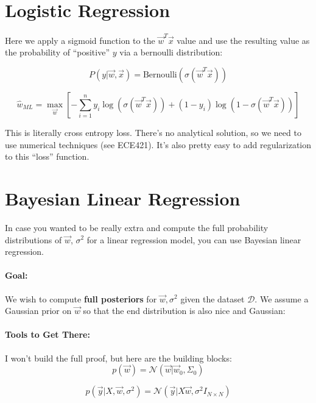 \documentclass[a4paper,12pt]{report}
\begin{document}
\section{Logistic Regression}

Here we apply a sigmoid function to the $\vec w^T \vec x$ value and use the resulting value as the probability of ``positive'' $y$ via a bernoulli distribution:

\begin{equation}
P(y | \vec w, \vec x) = \text{Bernoulli}(\sigma(\vec w^T \vec x))
\end{equation}

\begin{equation}
\hat w_{ML} = \max_{\vec w}[-\sum_{i=1}^{n} y_i\log(\sigma(\vec w^T\vec x)) + (1-y_i) \log(1-\sigma(\vec w^T \vec x))  ]
\end{equation}

This is literally cross entropy loss. There's no analytical solution, so we need to use numerical techniques (see ECE421). It's also pretty easy to add regularization to this ``loss'' function.

\section{Bayesian Linear Regression}

In case you wanted to be really extra and compute the full probability distributions of $\vec w$, $\sigma^2$ for a linear regression model, you can use Bayesian linear regression.

\paragraph{Goal: } We wish to compute \textbf{full posteriors} for $\vec w, \sigma^2$ given the dataset $\mathcal D$. We assume a Gaussian prior on $\vec w$ so that the end distribution is also nice and Gaussian:

\paragraph{Tools to Get There: } I won't build the full proof, but here are the building blocks:
\begin{equation}
p(\vec w) = \mathcal N(\vec w | \vec w_0, \Sigma_0)
\end{equation}

\begin{equation}
p(\vec y | X, \vec w, \sigma^2) = \mathcal N(\vec y | X\vec w, \sigma^2I_{N\times N})
\end{equation}
\end{document}
